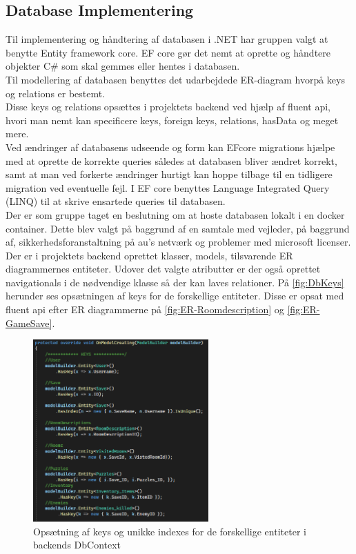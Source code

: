 \subsection{Database Implementering}
\label{Section: DB-Implementering}
Til implementering og håndtering af databasen i .NET har gruppen valgt at benytte Entity framework core.
EF core gør det nemt at oprette og håndtere objekter C\# som skal gemmes eller hentes i databasen.\\
Til modellering af databasen benyttes det udarbejdede ER-diagram hvorpå keys og relations er bestemt.\\
Disse keys og relations opsættes i projektets backend ved hjælp af fluent api, hvori man nemt kan specificere keys, foreign keys, relations, hasData og meget mere.\\
Ved ændringer af databasens udseende og form kan EFcore migrations hjælpe med at oprette de korrekte queries således at databasen bliver ændret korrekt, samt at man ved forkerte ændringer hurtigt kan hoppe tilbage til en tidligere migration ved eventuelle fejl. I EF core benyttes Language Integrated Query (LINQ) til at skrive ensartede queries til databasen.\\
Der er som gruppe taget en beslutning om at hoste databasen lokalt i en docker container. Dette blev valgt på baggrund af en samtale med vejleder, på baggrund af, sikkerhedsforanstaltning på au’s netværk og problemer med microsoft licenser.\\

\noindent Der er i projektets backend oprettet klasser, models, tilsvarende ER diagrammernes entiteter. Udover det valgte atributter er der også oprettet navigationals i de nødvendige klasse så der kan laves relationer.
På \autoref{fig:DbKeys} herunder ses opsætningen af keys for de forskellige entiteter. Disse er opsat med fluent api efter ER diagrammerne på \autoref{fig:ER-Roomdescription} og \autoref{fig:ER-GameSave}.

\begin{figure}[H]
\centering
\includegraphics[width = 0.6\textwidth]{02-Body/Images/DAL-Database/DbKeys.PNG}
\caption{Opsætning af keys og unikke indexes for de forskellige entiteter i backends DbContext}
\label{fig:DbKeys}
\end{figure}

